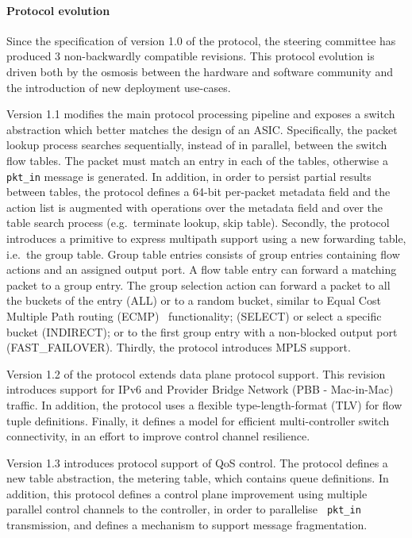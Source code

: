\paragraph{Protocol evolution} 

Since the specification of version 1.0 of the protocol, the \of steering
committee has produced 3 non-backwardly compatible revisions. This
protocol evolution is driven both by the osmosis between the hardware and
software community and the introduction of new deployment use-cases. 

Version 1.1  modifies the main protocol processing pipeline and exposes a switch
abstraction which better matches the design of an ASIC\@. Specifically, the packet
lookup process searches sequentially, instead of in parallel, between the switch
flow tables.  The packet must match an entry in each of the tables, otherwise a
{\tt pkt\_in} message is generated. In addition, in order to persist partial
results between tables, the protocol defines a 64-bit per-packet metadata field
and the action list is augmented with operations over the metadata field and
over the table search process (e.g.~terminate lookup, skip table).  Secondly,
the protocol introduces a primitive to express multipath support
using a new forwarding table, i.e.~the group table.  Group table entries consists of
group entries containing flow actions and an assigned output port. A flow table
entry can forward a matching packet to a group entry. The group selection action
can forward a packet to all the buckets of the entry (ALL) or to a random
bucket, similar to Equal Cost Multiple Path routing (ECMP)~
functionality; (SELECT) or select a specific bucket (INDIRECT); or to the first
group entry with a non-blocked output port (FAST\_FAILOVER).  Thirdly, the
protocol introduces MPLS support.

Version 1.2 of the protocol extends data plane protocol support. This revision
introduces support for IPv6 and Provider Bridge Network (PBB - Mac-in-Mac)
traffic. In addition, the protocol uses a flexible type-length-format (TLV) for
flow tuple definitions.  Finally, it defines a model for efficient
multi-controller switch connectivity, in an effort to improve control channel 
resilience.

Version 1.3 introduces protocol support of QoS control. The protocol defines a
new table abstraction, the metering table, which contains queue definitions. In
addition, this protocol defines a control plane improvement using multiple
parallel control channels to the controller, in order to parallelise {\tt
  pkt\_in} transmission, and defines a mechanism to support message
fragmentation.  

